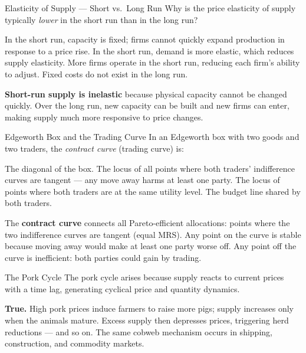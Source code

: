 \documentclass[paper=a5]{scrartcl}
\begin{document}
\begin{question}[type=mc]{Elasticity of Supply — Short vs.\ Long Run}
Why is the price elasticity of supply typically \emph{lower} in the short run
than in the long run?
\begin{choices}
  \correctchoice In the short run, capacity is fixed; firms cannot quickly
                 expand production in response to a price rise.
  \choice        In the short run, demand is more elastic, which reduces supply
                 elasticity.
  \choice        More firms operate in the short run, reducing each firm's
                 ability to adjust.
  \choice        Fixed costs do not exist in the long run.
\end{choices}
\begin{solution}
  \textbf{Short-run supply is inelastic} because physical capacity cannot be
  changed quickly. Over the long run, new capacity can be built and new firms
  can enter, making supply much more responsive to price changes.
\end{solution}
\end{question}

\begin{question}[type=mc]{Edgeworth Box and the Trading Curve}
In an Edgeworth box with two goods and two traders, the \emph{contract curve}
(trading curve) is:
\begin{choices}
  \choice        The diagonal of the box.
  \correctchoice The locus of all points where both traders' indifference curves
                 are tangent — any move away harms at least one party.
  \choice        The locus of points where both traders are at the same utility level.
  \choice        The budget line shared by both traders.
\end{choices}
\begin{solution}
  The \textbf{contract curve} connects all Pareto-efficient allocations: points
  where the two indifference curves are tangent (equal MRS). Any point on the
  curve is stable because moving away would make at least one party worse off.
  Any point off the curve is inefficient: both parties could gain by trading.
\end{solution}
\end{question}

\begin{question}[type=tf]{The Pork Cycle}
The pork cycle arises because supply reacts to current prices with a time lag,
generating cyclical price and quantity dynamics.
\truefalse[true]
\begin{solution}
  \textbf{True.} High pork prices induce farmers to raise more pigs; supply
  increases only when the animals mature. Excess supply then depresses prices,
  triggering herd reductions — and so on. The same cobweb mechanism occurs in
  shipping, construction, and commodity markets.
\end{solution}
\end{question}
\end{document}
